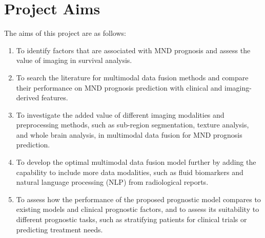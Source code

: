 
\section{Project Aims}

The aims of this project are as follows:

\begin{enumerate}[label=Aim \arabic*:]
    \item To identify factors that are associated with MND prognosis and assess the value of imaging in survival analysis.
    \item To search the literature for multimodal data fusion methods and compare their performance on MND prognosis prediction with clinical and imaging-derived features.
    \item To investigate the added value of different imaging modalities and preprocessing methods, such as sub-region segmentation, texture analysis, and whole brain analysis, in multimodal data fusion for MND prognosis prediction.
    \item To develop the optimal multimodal data fusion model further by adding the capability to include more data modalities, such as fluid biomarkers and natural language processing (NLP) from radiological reports.
    \item To assess how the performance of the proposed prognostic model compares to existing models and clinical prognostic factors, and to assess its suitability to different prognostic tasks, such as stratifying patients for clinical trials or predicting treatment needs.
\end{enumerate}


